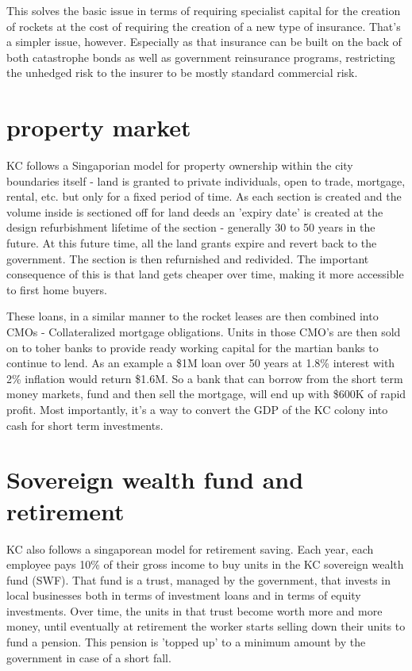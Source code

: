 \documentclass[10pt]{article}
\begin{document}
This solves the basic issue in terms of requiring specialist capital for the creation of rockets at the cost of requiring the creation of a new type of insurance. That's a simpler issue, however. Especially as that insurance can be built on the back of both catastrophe bonds as well as government reinsurance programs, restricting the unhedged risk to the insurer to be mostly standard commercial risk.

\section{property market}
KC follows a Singaporian model for property ownership within the city boundaries itself - land is granted to private individuals, open to trade, mortgage, rental, etc. but only for a fixed period of time. As each section is created and the volume inside is sectioned off for land deeds an 'expiry date' is created at the design refurbishment lifetime of the section - generally 30 to 50 years in the future. At this future time, all the land grants expire and revert back to the government. The section is then refurnished and redivided. The important consequence of this is that land gets cheaper over time, making it more accessible to first home buyers.

These loans, in a similar manner to the rocket leases are then combined into CMOs - Collateralized mortgage obligations. Units in those CMO's are then sold on to toher banks to provide ready working capital for the martian banks to continue to lend. As an example a \$1M loan over 50 years at 1.8\% interest with 2\% inflation would return \$1.6M. So a bank that can borrow from the short term money markets, fund and then sell the mortgage, will end up with \$600K of rapid profit. Most importantly, it's a way to convert the GDP of the KC colony into cash for short term investments.

\section{Sovereign wealth fund and retirement}
KC also follows a singaporean model for retirement saving. Each year, each employee pays 10\% of their gross income to buy units in the KC sovereign wealth fund (SWF). That fund is a trust, managed by the government, that invests in local businesses both in terms of investment loans and in terms of equity investments. Over time, the units in that trust become worth more and more money, until eventually at retirement the worker starts selling down their units to fund a pension. This pension is 'topped up' to a minimum amount by the government in case of a short fall.
\end{document}
